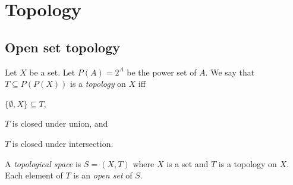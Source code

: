 \chapter{Topology}

\section{Open set topology}

Let \(X\) be a set.
Let \(P(A) = 2^A\) be the power set of \(A\).
We say that \(T \subseteq P(P(X))\) is a \emph{topology} on \(X\) iff
\begin{enumerate*}[label={(\arabic*)}]
    \item \(\{ \emptyset, X \} \subseteq T\),
    \item \(T\) is closed under union, and
    \item \(T\) is closed under intersection.
\end{enumerate*}

A \emph{topological space} is \(S = (X,T)\) where \(X\) is a set and \(T\) is a topology on \(X\).
Each element of \(T\) is an \emph{open set} of \(S\).
